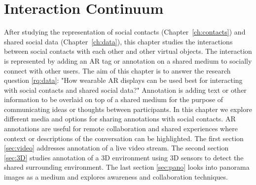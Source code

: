 \chapter{Interaction Continuum} %
\label{ch:annotation} %

After studying the representation of social contacts (Chapter~\ref{ch:contacts}) and shared social data (Chapter~\ref{ch:data}), this chapter studies the interactions between social contacts with each other and other virtual objects. The interaction is represented by adding an AR tag or annotation on a shared medium to socially connect with other users. 
The aim of this chapter is to answer the research question \ref{rq:data}: "How wearable AR displays can be used best for interacting with social contacts and shared social data?"
Annotation is adding text or other information to be overlaid on top of a shared medium for the purpose of communicating ideas or thoughts between participants. In this chapter we explore different media and options for sharing annotations with social contacts. AR annotations are useful for remote collaboration and shared experiences where context or descriptions of the conversation can be highlighted.  
The first section \ref{sec:video} addresses annotation of a live video stream. The second section \ref{sec:3D} studies annotation of a 3D environment using 3D sensors to detect the shared surrounding environment. The last section \ref{sec:pano} looks into panorama images as a medium and explores awareness and collaboration techniques. 





